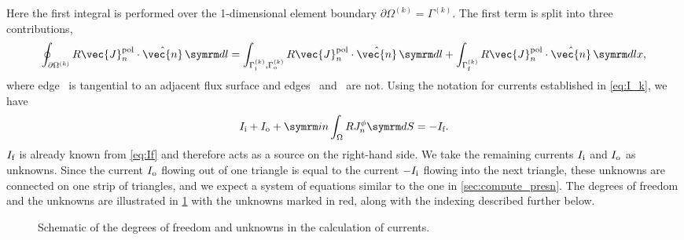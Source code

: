 Here the first integral is performed over the 1-dimensional element boundary $\partial \Omega^{(k)} = \Gamma^{(k)}$. The first term is split into three contributions,
\begin{gather}
  \oint_{\partial \Omega^{(k)}} R \vec{J}_{n}^{\pol} \cdot \hat{\vec{n}} \, \diff l = \int_{\Gamma_{\inw}^{(k)}, \Gamma_{\out}^{(k)}} R \vec{J}_{n}^{\pol} \cdot \hat{\vec{n}} \, \diff l + \int_{\Gamma_{\fs}^{(k)}} R \vec{J}_{n}^{\pol} \cdot \hat{\vec{n}} \, \diff lx,
\end{gather}
where edge \fs\ is tangential to an adjacent flux surface and edges \inw\ and \out\ are not. Using the notation for currents established in \cref{eq:I_k}, we have
\begin{gather}
  I_{\inw} + I_{\out} + \im n \int_{\Omega} R J_{n}^{\phi} \diff S = -I_{\fs}.
\end{gather}
$I_{\textrm{f}}$ is already known from \cref{eq:If} and therefore acts as a source on the right-hand side. We take the remaining currents $I_{\textrm{i}}$ and $I_{\textrm{o}}$ as unknowns. Since the current $I_{\textrm{o}}$ flowing out of one triangle is equal to the current $-I_{\textrm{i}}$ flowing into the next triangle, these unknowns are connected on one strip of triangles, and we expect a system of equations similar to the one in \cref{sec:compute_presn}. The degrees of freedom and the unknowns are illustrated in \cref{fig:current_perturbation} with the unknowns marked in red, along with the indexing described further below.
\begin{figure}[bth]
  \centering
  
  \caption{Schematic of the degrees of freedom and unknowns in the calculation of currents.}
  \label{fig:current_perturbation}
\end{figure}

